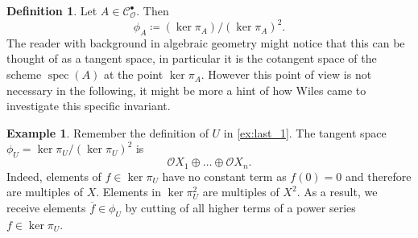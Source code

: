 \documentclass{article}
\theoremstyle{plain}%
\theoremstyle{definition}
\newtheorem{definition}{Definition}[section]
\newtheorem{example}{Example}[section]
\theoremstyle{remark}
\newcommand{\cob}{\mathcal{C}_\mathcal{O}^\bullet}
\begin{document}
\begin{definition}
    Let \(A \in \cob\). Then
    \[\phi_A \coloneqq (\ker \pi_A)/(\ker \pi_A)^2.\]
    The reader with background in algebraic geometry might notice that this can be thought of as a tangent space, 
    in particular it is the cotangent space of the scheme \(\operatorname{spec}(A)\) at the point \(\ker \pi_A\).
    However this point of view is not necessary in the following, 
    it might be more a hint of how Wiles came to investigate this specific invariant.
\end{definition}

\begin{example}\label{ex:last_phi}
    Remember the definition of \(U\) in \cref{ex:last_1}.
    The tangent space \(\phi_U = \ker \pi_U/(\ker \pi_U)^2\) is
    \[
        \mathcal{O}X_1 \oplus \dots \oplus \mathcal{O}X_n.
    \]
    Indeed, elements of \(f \in \ker \pi_U\) have no constant term as \(f(0) = 0\) and therefore are multiples of \(X\).
    Elements in \(\ker \pi_U^2\) are multiples of \(X^2\). As a result, we receive elements \(\overline{f} \in \phi_U\) by
    cutting of all higher terms of a power series \(f \in \ker \pi_U\).
\end{example}
\end{document}
